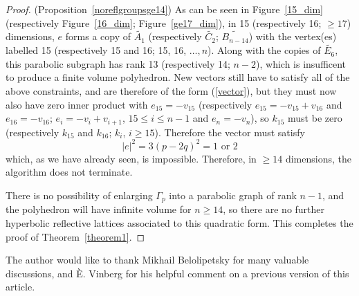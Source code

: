 \documentclass[smallcondensed]{svjour3}                     %
\begin{document}
\begin{proof}{(Proposition~\ref{noreflgroupsge14})}
As can be seen in Figure~\ref{15_dim} (respectively Figure~\ref{16_dim}; Figure~\ref{ge17_dim}), in 15 (respectively 16; $\ge 17$) dimensions, $e$ forms a copy of $\tilde{A_1}$ (respectively $\tilde{C_2}$; $\tilde{B_{n-14}}$) with the vertex(es) labelled 15 (respectively 15 and 16; 15, 16, $\ldots, n$). Along with the copies of $\tilde{E_6}$, this parabolic subgraph has rank 13 (respectively 14; $n-2$), which is insufficent to produce a finite volume polyhedron. New vectors still have to satisfy all of the above constraints, and are therefore of the form (\ref{vector}), but they must now also have zero inner product with $e_{15} = -v_{15}$ (respectively $e_{15} = -v_{15} + v_{16}$ and $e_{16} = -v_{16}$; $e_i = -v_i + v_{i+1}$, $15 \le i \le n-1$  and $e_n = -v_n$), so $k_{15}$ must be zero (respectively $k_{15}$ and $k_{16}$; $k_i$, $i \ge 15$). Therefore the vector must satisfy
\[|e|^2 = 3(p-2q)^2 = 1 \text{ or } 2\]
which, as we have already seen, is impossible. Therefore, in $\ge 14$ dimensions, the algorithm does not terminate.

There is no possibility of enlarging $\Gamma_p$ into a parabolic graph of rank $n-1$, and the polyhedron will have infinite volume for $n\ge 14$, so there are no further hyperbolic reflective lattices associated to this quadratic form. This completes the proof of Theorem~\ref{theorem1}.
\end{proof}

\begin{acknowledgements}
The author would like to thank Mikhail Belolipetsky for many valuable discussions, and {\`E.} Vinberg for his helpful comment on a previous version of this article.
\end{acknowledgements}

\end{document}
